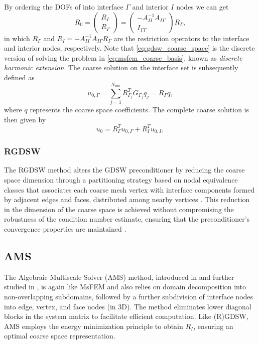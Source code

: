 By ordering the DOFs of into interface $\Gamma$ and interior $I$ nodes we can get \cite[Equation 4,5]{ams_coarse_space_comp_study_Alves2024}
\begin{equation}
    R_0 = 
    \begin{pmatrix}
        R_I \\
        R_{\Gamma}
    \end{pmatrix} =
    \begin{pmatrix}
        -A_{II}^{-1} A_{I\Gamma} \\
        I_{\Gamma\Gamma}
    \end{pmatrix} R_{\Gamma},
    \label{eq:gdsw_coarse_space}
\end{equation}
in which $R_{\Gamma}$ and $R_I = -A_{II}^{-1} A_{I\Gamma} R_{\Gamma}$ are the restriction operators to the interface and interior nodes, respectively. Note that \cref{eq:gdsw_coarse_space} is the discrete version of solving the problem in \cref{eq:msfem_coarse_basis}, known as \textit{discrete harmonic extension}. The coarse solution on the interface set is subsequently defined as
\[
    u_{0,\Gamma} = \sum_{j=1}^{N_{\text{sub}}} R^T_{\Gamma_j} G_{\Gamma_j} q_j = R_{\Gamma} q,
\]
where $q$ represents the coarse space coefficients. The complete coarse solution is then given by 
\[
    u_0 = R^T_{\Gamma} u_{0,\Gamma} + R^T_I u_{0,I},
\]
 
\subsubsection{RGDSW}
The RGDSW method alters the GDSW preconditioner by reducing the coarse space dimension through a partitioning strategy based on nodal equivalence classes that associates each coarse mesh vertex with interface components formed by adjacent edges and faces, distributed among nearby vertices \cite{rgdsw_coarse_space_Dohrmann2017}. This reduction in the dimension of the coarse space is achieved without compromising the robustness of the condition number estimate, ensuring that the preconditioner's convergence properties are maintained \cite{argdsw_coarse_space_Heinlein2022}.

\subsection{AMS}
The Algebraic Multiscale Solver (AMS) method, introduced in \cite{msfvm_ams_Lunati2009,ams_framework_Wang2014} and further studied in \cite{ams_coarse_space_comp_study_Alves2024}, is again like MsFEM and also relies on domain decomposition into non-overlapping subdomains, followed by a further subdivision of interface nodes into edge, vertex, and face nodes (in 3D). The method eliminates lower diagonal blocks in the system matrix to facilitate efficient computation. Like (R)GDSW, AMS employs the energy minimization principle to obtain $R_I$, ensuring an optimal coarse space representation.

